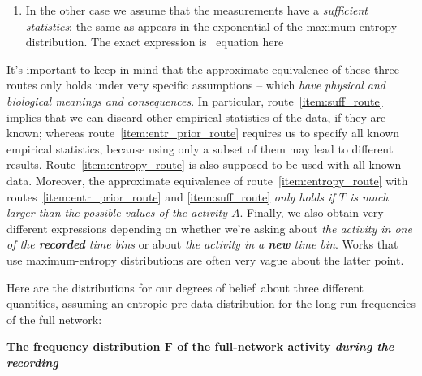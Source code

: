 \documentclass[\ifafour a4paper,12pt,\else a5paper,10pt,\fi%
onecolumn,oneside,article,%
british%
]{memoir}
\makeatletter
\theoremstyle{remark}
\theoremstyle{innote}
\def\sum{\DOTSI\sumop\slimits@}
\def\prod{\DOTSI\prodop\slimits@}
\newcommand*{\delt}{\deltaup}%
\newcommand*{\di}{\mathrm{d}}%
\newcommand*{\pf}{\mathrm{p}}%
\newcommand*{\p}{\mathrm{P}}%
\renewcommand*{\|}[1][]{\nonscript\,#1\vert\nonscript\;\mathopen{}}
\newcommand*{\tprod}{\mathop{\textstyle\prod}\nolimits}
\newcommand*{\tsum}{\mathop{\textstyle\sum}\nolimits}
\newcommand*{\puzzle}{{\fontencoding{U}\fontfamily{fontawesometwo}\selectfont\symbol{225}}}
\newcommand{\mynote}[1]{ {\color{notecolour}\puzzle\ #1}}
\newcommand*{\dobs}{degrees of belief}
\newcommand*{\yAv}{A}
\newcommand*{\yav}{a}
\newcommand*{\yFF}{F}
\newcommand*{\yff}{f}
\newcommand*{\yF}{\bm{\yFF}}
\newcommand*{\yf}{\bm{\yff}}
\newcommand*{\yaa}{\bm{\yav}}%
\newcommand*{\yA}{\yAv}%
\newcommand*{\yl}{\bm{l}}
\newcommand*{\yk}{z}
\makeatother
\begin{document}
\begin{enumerate}[wide,label=(\alph*)]
\item \label{item:suff_route}In the other case we assume that the
  measurements have a \emph{sufficient statistics}: the same as appears in
  the exponential of the maximum-entropy distribution. The exact expression is\mynote{equation here}
\end{enumerate}

It's important to keep in mind that the approximate equivalence of these
three routes only holds under very specific assumptions -- which \emph{have
  physical and biological meanings and consequences}. In particular,
route~\ref{item:suff_route} implies that we can discard other empirical
statistics of the data, if they are known; whereas
route~\ref{item:entr_prior_route} requires us to specify all known
empirical statistics, because using only a subset of them may lead to
different results. Route~\ref{item:entropy_route} is also supposed to be
used with all known data. Moreover, the approximate equivalence of
route~\ref{item:entropy_route} with routes~\ref{item:entr_prior_route} and
\ref{item:suff_route} \emph{only holds if $T$ is much larger than the
  possible values of the activity $\yA$}. Finally, we also obtain very
different expressions depending on whether we're asking about \emph{the
  activity in one of the \textbf{recorded} time bins} or about \emph{the
  activity in a \textbf{new} time bin}. Works that use maximum-entropy
distributions are often very vague about the latter point.


\bigskip

Here are the distributions for our \dobs\ about three different quantities,
assuming an entropic pre-data distribution for the long-run frequencies of
the full network:

\textbf{The frequency distribution $\yF$ of the full-network activity
  \emph{during the recording}}
\end{document}
